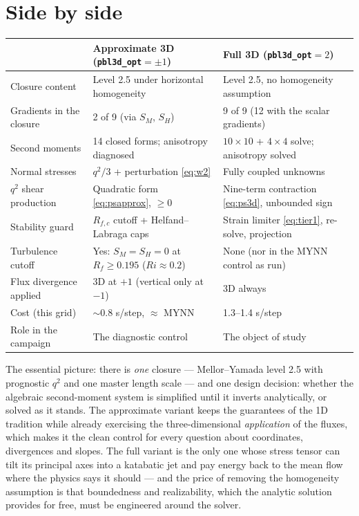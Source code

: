 \documentclass[10pt,a4paper]{article}
\begin{document}
\section{Side by side}

\begin{center}
\footnotesize
\begin{tabular}{@{}lll@{}}
\toprule
 & Approximate 3D (\texttt{pbl3d\_opt}$=\pm1$) & Full 3D (\texttt{pbl3d\_opt}$=2$) \\
\midrule
Closure content & Level 2.5 under horizontal homogeneity & Level 2.5, no homogeneity assumption \\
Gradients in the closure & 2 of 9 (via $S_M$, $S_H$) & 9 of 9 (12 with the scalar gradients) \\
Second moments & 14 closed forms; anisotropy diagnosed & $10{\times}10$ + $4{\times}4$ solve; anisotropy solved \\
Normal stresses & $q^2/3$ + perturbation \eqref{eq:w2} & Fully coupled unknowns \\
$q^2$ shear production & Quadratic form \eqref{eq:psapprox}, $\ge 0$ & Nine-term contraction \eqref{eq:ps3d}, unbounded sign \\
Stability guard & $R_{f,c}$ cutoff + Helfand--Labraga caps & Strain limiter \eqref{eq:tier1}, re-solve, projection \\
Turbulence cutoff & Yes: $S_M = S_H = 0$ at $R_f \ge 0.195$ ($Ri \approx 0.2$) & None (nor in the MYNN control as run) \\
Flux divergence applied & 3D at $+1$ (vertical only at $-1$) & 3D always \\
Cost (this grid) & $\sim$0.8 s/step, $\approx$ MYNN & 1.3--1.4 s/step \\
Role in the campaign & The diagnostic control & The object of study \\
\bottomrule
\end{tabular}
\end{center}

The essential picture: there is \emph{one} closure — Mellor--Yamada level 2.5 with prognostic $q^2$ and one master length scale — and one design decision: whether the algebraic second-moment system is simplified until it inverts analytically, or solved as it stands. The approximate variant keeps the guarantees of the 1D tradition while already exercising the three-dimensional \emph{application} of the fluxes, which makes it the clean control for every question about coordinates, divergences and slopes. The full variant is the only one whose stress tensor can tilt its principal axes into a katabatic jet and pay energy back to the mean flow where the physics says it should — and the price of removing the homogeneity assumption is that boundedness and realizability, which the analytic solution provides for free, must be engineered around the solver.
\end{document}
